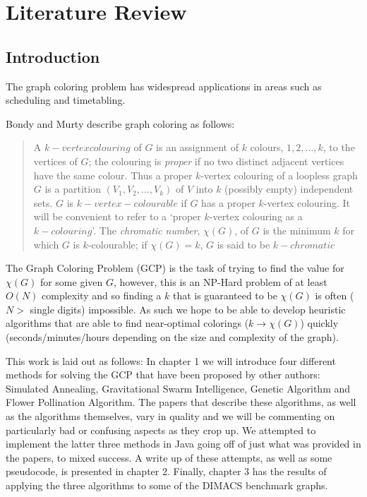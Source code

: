 \chapter{Literature Review}

\section{Introduction}

The graph coloring problem has widespread applications in areas such as scheduling and timetabling.

Bondy and Murty describe graph coloring as follows:
\begin{quotation}
A $k-vertex colouring$ of $G$ is an assignment of $k$ colours, $1,2,\ldots,k$, to the vertices of $G$; the colouring is \emph{proper} if no two distinct adjacent vertices have the same colour. Thus a proper $k$-vertex colouring of a loopless graph $G$ is a partition $(V_1,V_2,\ldots,V_k)$ of $V$ into $k$ (possibly empty) independent sets. $G$ is $k-vertex-colourable$ if $G$ has a proper $k$-vertex colouring. It will be convenient to refer to a `proper $k$-vertex colouring as a $k-colouring$'.
The \emph{chromatic number}, $\chi(G)$, of $G$ is the minimum $k$ for which $G$ is $k$-colourable; if $\chi(G)=k$, $G$ is said to be $k-chromatic$
\end{quotation}

The Graph Coloring Problem (GCP) is the task of trying to find the value for $\chi(G)$ for some given $G$, however, this is an NP-Hard problem of at least $O(N)$ complexity and so finding a $k$ that is guaranteed to be $\chi(G)$ is often ($N>$ single digits) impossible. As such we hope to be able to develop heuristic algorithms that are able to find near-optimal colorings ($k \rightarrow \chi(G)$) quickly (seconds/minutes/hours depending on the size and complexity of the graph).

This work is laid out as follows:
In chapter 1 we will introduce four different methods for solving the GCP that have been proposed by other authors: Simulated Annealing, Gravitational Swarm Intelligence, Genetic Algorithm and Flower Pollination Algorithm. The papers that describe these algorithms, as well as the algorithms themselves, vary in quality and we will be commenting on particularly bad or confusing aspects as they crop up.
We attempted to implement the latter three methods in Java going off of just what was provided in the papers, to mixed success. A write up of these attempts, as well as some pseudocode, is presented in chapter 2.
Finally, chapter 3 has the results of applying the three algorithms to some of the DIMACS benchmark graphs.






